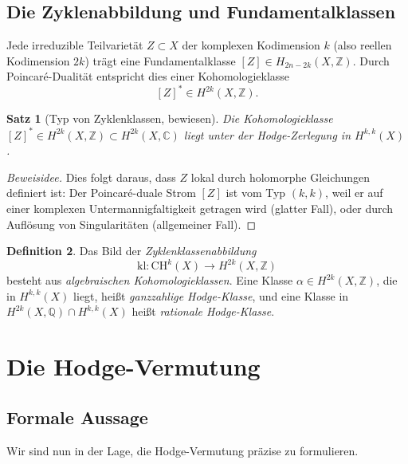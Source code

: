 \documentclass[12pt,a4paper]{amsart}
\newtheorem{theorem}{Satz}[section]
\theoremstyle{definition}
\newtheorem{definition}[theorem]{Definition}
\theoremstyle{remark}
\begin{document}
\subsection{Die Zyklenabbildung und Fundamentalklassen}

Jede irreduzible Teilvarietät $Z \subset X$ der komplexen Kodimension $k$ (also
reellen Kodimension $2k$) trägt eine Fundamentalklasse $[Z] \in H_{2n-2k}(X, \mathbb{Z})$.
Durch Poincaré-Dualität entspricht dies einer Kohomologieklasse
\[
  [Z]^* \in H^{2k}(X, \mathbb{Z}).
\]

\begin{theorem}[Typ von Zyklenklassen, bewiesen]
\label{thm:zyklus-typ}
Die Kohomologieklasse $[Z]^* \in H^{2k}(X, \mathbb{Z}) \subset H^{2k}(X, \mathbb{C})$
liegt unter der Hodge-Zerlegung in $H^{k,k}(X)$.
\end{theorem}

\begin{proof}[Beweisidee]
Dies folgt daraus, dass $Z$ lokal durch holomorphe Gleichungen definiert ist: Der
Poincaré-duale Strom $[Z]$ ist vom Typ $(k,k)$, weil er auf einer komplexen
Untermannigfaltigkeit getragen wird (glatter Fall), oder durch Auflösung von
Singularitäten (allgemeiner Fall).
\end{proof}

\begin{definition}
Das Bild der \emph{Zyklenklassenabbildung}
\[
  \mathrm{kl}: \mathrm{CH}^k(X) \longrightarrow H^{2k}(X, \mathbb{Z})
\]
besteht aus \emph{algebraischen Kohomologieklassen}. Eine Klasse
$\alpha \in H^{2k}(X,\mathbb{Z})$, die in $H^{k,k}(X)$ liegt, heißt
\emph{ganzzahlige Hodge-Klasse}, und eine Klasse in
$H^{2k}(X, \mathbb{Q}) \cap H^{k,k}(X)$ heißt \emph{rationale Hodge-Klasse}.
\end{definition}

\section{Die Hodge-Vermutung}
\label{sec:vermutung}

\subsection{Formale Aussage}

Wir sind nun in der Lage, die Hodge-Vermutung präzise zu formulieren.
\end{document}
